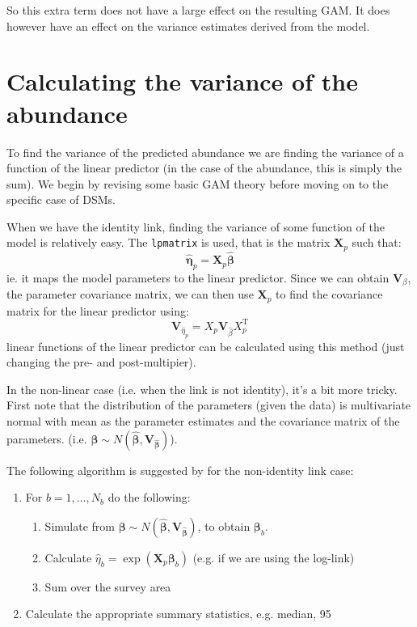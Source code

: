 \documentclass[11pt]{amsart}
\begin{document}
So this extra term does not have a large effect on the resulting GAM. It does however have an effect on the variance estimates derived from the model.

\section{Calculating the variance of the abundance}

To find the variance of the predicted abundance we are finding the variance of a function of the linear predictor (in the case of the abundance, this is simply the sum). We begin by revising some basic GAM theory before moving on to the specific case of DSMs. 

When we have the identity link, finding the variance of some function of the model is relatively easy. The \texttt{lpmatrix} \citep[][page 245]{Wood:2006wz} is used, that is the matrix $\bm{X}_{p}$ such that:
$$
\hat{\bm{\eta}}_p = \bm{X}_{p} \hat{\bm{\beta}}
$$
ie. it maps the model parameters to the linear predictor. Since we can obtain $\bm{V}_{\beta}$, the parameter covariance matrix, we can then use $\bm{X}_{p}$ to find the covariance matrix for the linear predictor using:
$$
\bm{V}_{\hat{\eta}_p} = X_p \bm{V}_{\hat{\beta}} X_p^\text{T}
$$
linear functions of the linear predictor can be calculated using this method (just changing the pre- and post-multipier). 

In the non-linear case (i.e. when the link is not identity), it's a bit more tricky. First note that the distribution of the parameters (given the data) is multivariate normal with mean as the parameter estimates and the covariance matrix of the parameters. (i.e. $\bm{\beta} \sim N(\hat{\bm{\beta}}, \bm{V_{\hat{\beta}}})$). 

The following algorithm is suggested by \citep[][page 246]{Wood:2006wz} for the non-identity link case:
\begin{enumerate}
	\item For $b=1, \ldots, N_b$ do the following:
	\begin{enumerate}
    		\item Simulate from $\bm{\beta} \sim N(\hat{\bm{\beta}}, \bm{V_{\hat{\beta}}})$, to obtain $\bm{\beta}_b$.
		\item Calculate $\hat{\eta}_b = \exp(\bm{X}_{p} \bm{\beta}_b)$ (e.g. if we are using the log-link)
		\item Sum over the survey area
	\end{enumerate}
	\item  Calculate the appropriate summary statistics, e.g. median, 95%
\end{enumerate}
\end{document}
